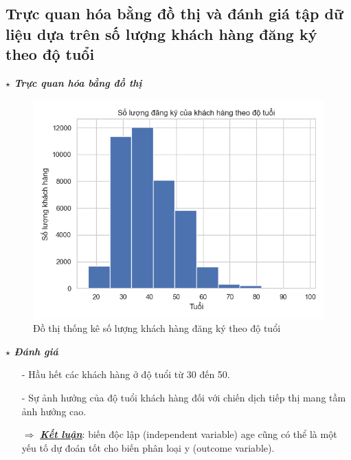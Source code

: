 \documentclass{report}
\begin{document}
        \pagebreak
        
        \subsection{Trực quan hóa bằng đồ thị và đánh giá tập dữ liệu dựa trên số lượng khách hàng đăng ký theo độ tuổi}
            \fontsize{13}{10}\selectfont \textbf{$\star$\textit{ Trực quan hóa bằng đồ thị}}
                \begin{figure}[htp]
                    \centering
                    \includegraphics[scale = 0.8]{image/hist_age.png}
                    \caption{Đồ thị thống kê  số lượng khách hàng đăng ký theo độ tuổi}
                \end{figure}
            
            \fontsize{13}{10}\selectfont \textbf{$\star$\textit{ Đánh giá}}
                \begin{enumerate}
                    \item [- ] Hầu hết các khách hàng ở độ tuổi từ 30 đến 50.
                    \item [- ] Sự ảnh hưởng của độ tuổi khách hàng đối với chiến dịch tiếp thị mang tầm ảnh hưởng cao.
                    \item [$\Rightarrow$] \textbf{\underline{\textit{Kết luận}}}: biến độc lập (independent variable) age cũng có thể là một yếu tố dự đoán tốt cho biến phân loại y (outcome variable).
                \end{enumerate}
            
\end{document}
